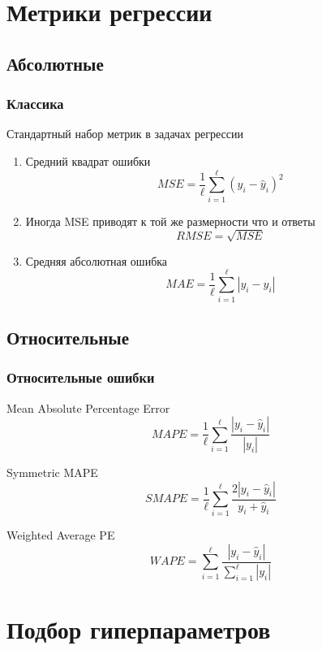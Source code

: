 \documentclass{beamer}
\begin{document}
	\section{Метрики регрессии}
	
	\subsection{Абсолютные}
	
	\begin{frame}
		\frametitle{Классика}
		Стандартный набор метрик в задачах регрессии
		
		\vspace{15pt}
		\begin{enumerate}
			\item 
			Средний квадрат ошибки
			\[
			MSE = \frac{1}{\ell}\sum_{i=1}^{\ell} (y_i - \hat{y}_i)^2
			\]
			\item
			Иногда MSE приводят к той же размерности что и ответы
			\[
			RMSE = \sqrt{MSE}
			\]
			\item 
			Средняя абсолютная ошибка
			\[
			MAE = \frac{1}{\ell}\sum_{i=1}^{\ell} |y_i - \hat{y}_i|
			\]
		\end{enumerate}
	\end{frame}
	
	\subsection{Относительные}
	
	\begin{frame}
		\frametitle{Относительные ошибки}
		
		Mean Absolute Percentage Error
		\[
		MAPE = \frac{1}{\ell} \sum_{i=1}^{\ell} \frac{|y_i - \hat{y}_i|}{|y_i|}
		\]
		
		Symmetric MAPE
		\[
		SMAPE = \frac{1}{\ell} \sum_{i=1}^{\ell} \frac{2 |y_i - \hat{y}_i|}{y_i + \hat{y}_i}
		\]
		
		Weighted Average PE
		\[
		WAPE = \sum_{i=1}^{\ell} \frac{|y_i - \hat{y}_i|}{\sum_{i=1}^{\ell} |y_i|}
		\]
	\end{frame}

	\section{Подбор гиперпараметров}
	
\end{document}
